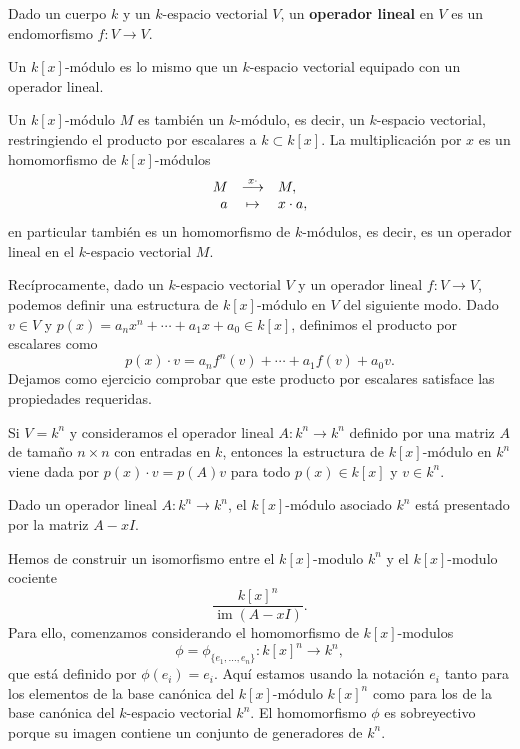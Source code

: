 Dado un cuerpo \(k\) y un \(k\)-espacio vectorial \(V\), un
\textbf{operador lineal} en \(V\) es un endomorfismo
\(f\colon V\rightarrow V\).


Un \(k[x]\)-módulo es lo mismo que un \(k\)-espacio vectorial equipado
con un operador lineal. 


Un \(k[x]\)-módulo \(M\) es también un \(k\)-módulo, es decir, un
\(k\)-espacio vectorial, restringiendo el producto por escalares a
\(k\subset k[x]\). La multiplicación por \(x\) es un homomorfismo de
\(k[x]\)-módulos
\[\begin{array}{rcl}M&\stackrel{x\cdot}\longrightarrow& M,\cr a&\mapsto &x\cdot a,\end{array}\]
en particular también es un homomorfismo de \(k\)-módulos, es decir, es
un operador lineal en el \(k\)-espacio vectorial \(M\).

Recíprocamente, dado un \(k\)-espacio vectorial \(V\) y un operador
lineal \(f\colon V\rightarrow V\), podemos definir una estructura de
\(k[x]\)-módulo en \(V\) del siguiente modo. Dado \(v\in V\) y
\(p(x)=a_nx^n+\cdots+a_1x+a_0\in k[x]\), definimos el producto por
escalares como \[p(x)\cdot v=a_nf^n(v)+\cdots+a_1f(v)+a_0v.\] Dejamos
como ejercicio comprobar que este producto por escalares satisface las
propiedades requeridas. 


Si \(V=k^n\) y consideramos el operador lineal
\(A\colon k^n\rightarrow k^n\) definido por una matriz \(A\) de tamaño
\(n\times n\) con entradas en \(k\), entonces la estructura de
\(k[x]\)-módulo en \(k^n\) viene dada por \(p(x)\cdot v=p(A)v\) para
todo \(p(x)\in k[x]\) y \(v\in k^n\). 


Dado un operador lineal \(A\colon k^n\rightarrow k^n\), el
\(k[x]\)-módulo asociado \(k^n\) está presentado por la matriz \(A-xI\).


Hemos de construir un isomorfismo entre el \(k[x]\)-modulo \(k^n\) y el
\(k[x]\)-modulo cociente \[\frac{k[x]^n}{\operatorname{im} (A-xI)}.\]
Para ello, comenzamos considerando el homomorfismo de \(k[x]\)-modulos
\[\phi=\phi_{\{e_1,\dots,e_n\}}\colon k[x]^n\longrightarrow k^n,\] que
está definido por \(\phi(e_i)=e_i\). Aquí estamos usando la notación
\(e_i\) tanto para los elementos de la base canónica del \(k[x]\)-módulo
\(k[x]^n\) como para los de la base canónica del \(k\)-espacio vectorial
\(k^n\). El homomorfismo \(\phi\) es sobreyectivo porque su imagen
contiene un conjunto de generadores de \(k^n\).

